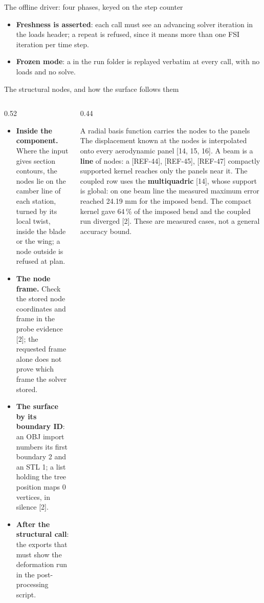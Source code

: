 \begin{frame}{The offline driver: four phases, keyed on the step counter}
\begin{itemize}
  \item \textbf{Freshness is asserted}: each call must see an advancing solver
        iteration in the loads header; a repeat is refused, since it means more
        than one FSI iteration per time step.
  \item \textbf{Frozen mode}: a  in the
        run folder is replayed verbatim at every call, with no loads and no solve.
\end{itemize}
\end{frame}

\begin{frame}{The structural nodes, and how the surface follows them}
\begin{columns}[T]
\begin{column}{0.52\textwidth}
\begin{itemize}\footnotesize
  \item \textbf{Inside the component.} Where the input gives section
        contours, the nodes lie on the camber line of each station, turned by
        its local twist, inside the blade or the wing; a node outside is
        refused at plan.
  \item \textbf{The node frame.} Check the stored node coordinates and frame
        in the probe evidence [2]; the requested frame alone does not prove
        which frame the solver stored.
  \item \textbf{The surface by its boundary ID}: an OBJ import numbers its
        first boundary 2 and an STL 1; a list holding the tree position maps
        0 vertices, in silence [2].
  \item \textbf{After the structural call}: the exports that must show the
        deformation run in the post-processing script.
\end{itemize}
\end{column}
\begin{column}{0.44\textwidth}
\begin{block}{A radial basis function carries the nodes to the panels}
\footnotesize The displacement known at the nodes is interpolated onto every
aerodynamic panel [14, 15, 16]. A beam is a \textbf{line} of nodes: a [REF-44], [REF-45], [REF-47]
compactly supported kernel reaches only the panels near it. The coupled row
uses the \textbf{multiquadric} [14], whose support is global: on one beam line
the measured maximum error reached 24.19 mm for the imposed bend.
The compact kernel gave 64\,\% of the imposed bend and the coupled run
 diverged [2]. These are measured cases, not a general accuracy bound.
\end{block}
\end{column}
\end{columns}
\end{frame}

